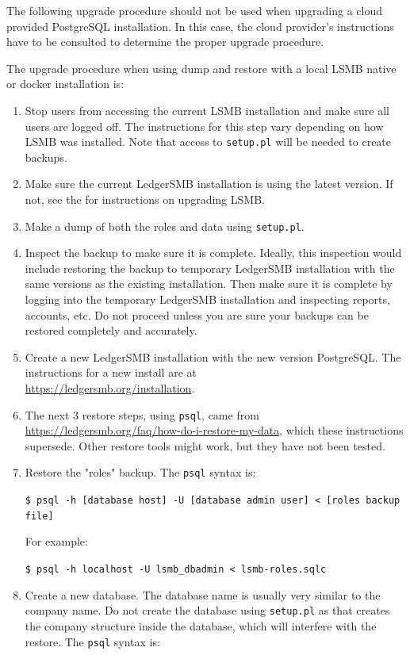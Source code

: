The following upgrade procedure should not be used when upgrading a cloud provided PostgreSQL installation.
In this case, the cloud provider's instructions have to be consulted to determine the proper upgrade procedure.

The upgrade procedure when using dump and restore with a local LSMB native or docker installation  is:
\begin{enumerate}
    \item Stop users from accessing the current LSMB installation and make sure all users are logged off. 
        The instructions for this step vary depending on how LSMB was installed. 
        Note that access to \texttt{setup.pl} will be needed to create backups.
    \item Make sure the current LedgerSMB installation is using the latest version.  
        If not, see the  for instructions on upgrading LSMB.
    \item Make a dump of both the roles and data using \texttt{setup.pl}.
    \item Inspect the backup to make sure it is complete. 
        Ideally, this inspection would include restoring the backup to temporary LedgerSMB installation with the same versions as the existing installation.
        Then make sure it is complete by logging into the temporary LedgerSMB installation and inspecting reports, accounts, etc. 
        Do not proceed unless you are sure your backups can be restored completely and accurately.
    \item Create a new LedgerSMB installation with the new version PostgreSQL. 
        The instructions for a new install are at\\
        \url{https://ledgersmb.org/installation}.
    \item The next 3 restore steps, using \texttt{psql}, came from\\
    \url{https://ledgersmb.org/faq/how-do-i-restore-my-data}, which these instructions supersede. 
        Other restore tools might work, but they have not been tested.
    \item Restore the "roles" backup. The \texttt{psql} syntax is:
        
        \texttt{\$ psql -h [database host] -U [database admin user] < [roles backup file]}
        
        For example:
        
        \texttt{\$ psql -h localhost -U lsmb\_dbadmin < lsmb-roles.sqlc}
    \item Create a new database. 
        The database name is usually very similar to the company name. 
        Do not create the database using \texttt{setup.pl} as that creates the company structure inside the database, which will interfere with the restore.   The \texttt{psql} syntax is:


\end{enumerate}

